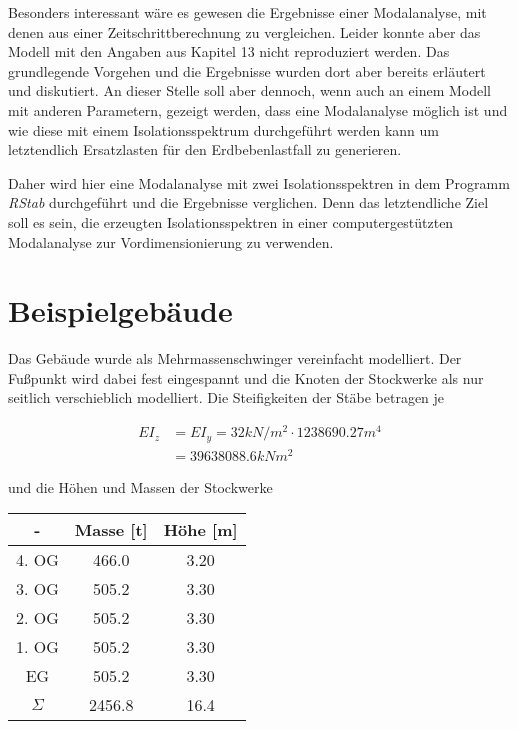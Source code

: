 Besonders interessant wäre es gewesen die Ergebnisse einer Modalanalyse, mit denen aus einer Zeitschrittberechnung zu vergleichen. Leider konnte aber das Modell mit den Angaben aus Kapitel 13 \cite{Isemann} nicht reproduziert werden.
Das grundlegende Vorgehen und die Ergebnisse wurden dort aber bereits erläutert und diskutiert. An dieser Stelle soll aber dennoch, wenn auch an einem Modell mit anderen Parametern, gezeigt werden, dass eine Modalanalyse möglich ist und wie diese mit einem Isolationsspektrum durchgeführt werden kann um letztendlich Ersatzlasten für den Erdbebenlastfall zu generieren.

Daher wird hier eine Modalanalyse mit zwei Isolationsspektren in dem Programm \emph{RStab} durchgeführt und die Ergebnisse verglichen. Denn das letztendliche Ziel soll es sein, die erzeugten Isolationsspektren in einer computergestützten Modalanalyse zur Vordimensionierung zu verwenden.

\pagebreak

\section{Beispielgebäude}
\label{sec:besipielgebaude}

Das Gebäude wurde als Mehrmassenschwinger vereinfacht modelliert. Der Fußpunkt wird dabei fest eingespannt und die Knoten der Stockwerke als nur seitlich verschieblich modelliert. Die Steifigkeiten der Stäbe betragen je

\begin{align*}
EI_z &= EI_y = 32 kN/m^2 \cdot 1238690.27 m^4\\
     &= 39638088.6 kNm^2
\end{align*}

und die Höhen und Massen der Stockwerke

\begin{table}[H]
\centering
\begin{tabular}{ |c|c|c| } 
 \hline
 - & Masse [t] & Höhe [m]\\
 \hline\hline
4. OG & 466.0 & 3.20\\
3. OG & 505.2 & 3.30\\
2. OG & 505.2 & 3.30\\
1. OG & 505.2 & 3.30\\
EG    & 505.2 & 3.30\\
 \hline \hline
$\Sigma$ & 2456.8 & 16.4\\
\hline
\end{tabular}
\end{table}

